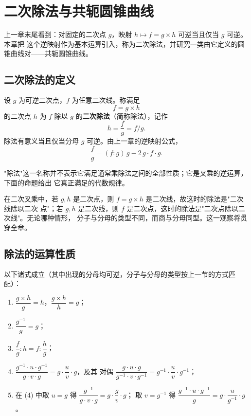 \chapter{二次除法与共轭圆锥曲线}

上一章末尾看到：对固定的二次点 $g$，映射 $h\mapsto f=g\times h$ 可逆当且仅当 $g$ 可逆。本章把
这个逆映射作为基本运算引入，称为二次除法，并研究一类由它定义的圆锥曲线对——共轭圆锥曲线。

\section{二次除法的定义}

\begin{definition}[二次除法]
\label{def:division}
设 $g$ 为可逆二次点，$f$ 为任意二次线。称满足
\[
f=g\times h
\]
的二次点 $h$ 为 $f$ 除以 $g$ 的\textbf{二次除法}（简称除法），记作
\[
h=\frac fg=f/g .
\]
除法有意义当且仅当分母 $g$ 可逆。由上一章的逆映射公式，
\begin{equation}
\label{eq:div-formula}
\frac fg=(f:g)\,g-2\,g\cdot f\cdot g .
\end{equation}
\end{definition}

\begin{remark}
"除法"这一名称并不表示它满足通常乘除法之间的全部性质；它是叉乘的逆运算，下面的命题给出
它真正满足的代数规律。
\end{remark}

在二次叉乘中，若 $g,h$ 是二次点，则 $f=g\times h$ 是二次线，故这时的除法是"二次线除以二次
点"；若 $g,h$ 是二次线，则 $f$ 是二次点，这时的除法是"二次点除以二次线"。无论哪种情形，
分子与分母的类型不同，而商与分母同型。这一观察将贯穿全章。

\section{除法的运算性质}

\begin{proposition}
\label{prop:div-laws}
以下诸式成立（其中出现的分母均可逆，分子与分母的类型按上一节的方式匹配）：
\begin{enumerate}[label=(\arabic*),itemsep=2pt]
  \item $\dfrac{g\times h}{g}=h$，$\dfrac{g\times h}{h}=g$；
  \item $\dfrac{g^{-1}}{g}=g$；
  \item $\dfrac fg:h=f:\dfrac hg$；
  \item $\dfrac{g^{-1}\cdot u\cdot g^{-1}}{g\cdot v\cdot g}=g\cdot\dfrac uv\cdot g$，及其
        对偶 $\dfrac{g\cdot u\cdot g}{g^{-1}\cdot v\cdot g^{-1}}=g^{-1}\cdot\dfrac uv\cdot g^{-1}$；
  \item 在 (4) 中取 $u=g$ 得 $\dfrac{g^{-1}}{g\cdot v\cdot g}=g\cdot\dfrac gv\cdot g$；
        取 $v=g^{-1}$ 得 $\dfrac{g^{-1}\cdot u\cdot g^{-1}}{g}=g\cdot\dfrac{u}{g^{-1}}\cdot g$。
\end{enumerate}
\end{proposition}

